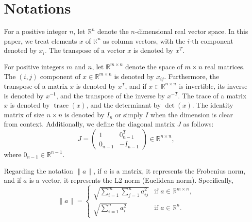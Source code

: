 \section{Notations}\label{sec:notation}


For a positive integer $n$, let $\mathbb{R}^n$ denote the $n$-dimensional real vector space.
In this paper, we treat elements $x$ of $\mathbb{R}^n$ as column vectors, with the $i$-th component denoted by $x_i$.
The transpose of a vector $x$ is denoted by $x^T$.

For positive integers $m$ and $n$, let $\mathbb{R}^{m \times n}$ denote the space of $m \times n$ real matrices.
The $(i,j)$ component of $x \in \mathbb{R}^{m \times n}$ is denoted by $x_{ij}$.
Furthermore, the transpose of a matrix $x$ is denoted by $x^T$, and if $x \in \mathbb{R}^{n \times n}$ is invertible, its inverse is denoted by $x^{-1}$, and the transpose of the inverse by $x^{-T}$.
The trace of a matrix $x$ is denoted by $\operatorname{trace}(x)$, and the determinant by $\operatorname{det}(x)$.
The identity matrix of size $n \times n$ is denoted by $I_n$ or simply $I$ when the dimension is clear from context.
Additionally, we define the diagonal matrix $J$ as follows:
\[
    J = \begin{pmatrix}
        1 & 0_{n-1}^T \\
        0_{n-1} & -I_{n-1}
    \end{pmatrix} \in \mathbb{R}^{n \times n},
\]
where $0_{n-1} \in \mathbb{R}^{n-1}$.

Regarding the notation $\|a\|$, if $a$ is a matrix, it represents the Frobenius norm, and if $a$ is a vector, it represents the L2 norm (Euclidean norm).
Specifically,
\[
\|a\| = 
\begin{cases}
    \sqrt{\sum_{i=1}^m \sum_{j=1}^n a_{ij}^2} & \text{if } a \in \mathbb{R}^{m \times n},\\
    \sqrt{\sum_{i=1}^n a_i^2} & \text{if } a \in \mathbb{R}^n.
\end{cases}
\]

